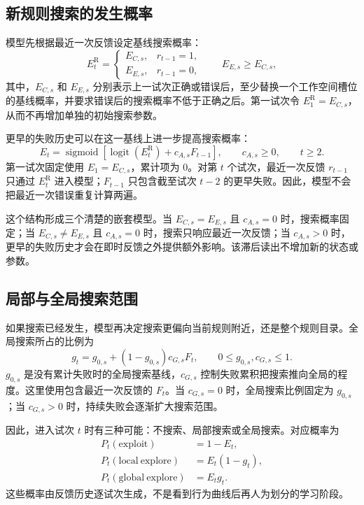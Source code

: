 \documentclass[12pt]{article}
\newcommand{\logit}{\operatorname{logit}}
\newcommand{\sigmoid}{\operatorname{sigmoid}}
\begin{document}
\subsection{新规则搜索的发生概率}

模型先根据最近一次反馈设定基线搜索概率：
\begin{equation}
E_t^{\mathrm R}
=
\begin{cases}
E_{C,s}, & r_{t-1}=1,\\
E_{E,s}, & r_{t-1}=0,
\end{cases}
\qquad
E_{E,s}\geq E_{C,s},
\label{eq:reactive-event}
\end{equation}
其中，$E_{C,s}$ 和 $E_{E,s}$ 分别表示上一试次正确或错误后，至少替换一个工作空间槽位的基线概率，并要求错误后的搜索概率不低于正确之后。第一试次令 $E_1^{\mathrm R}=E_{C,s}$，从而不再增加单独的初始搜索参数。

更早的失败历史可以在这一基线上进一步提高搜索概率：
\begin{equation}
E_t
=\sigmoid\!\left[
\logit(E_t^{\mathrm R})+c_{A,s}F_{t-1}
\right],
\qquad
c_{A,s}\geq0,
\qquad t\geq2.
\label{eq:accumulated-event}
\end{equation}
第一试次固定使用 $E_1=E_{C,s}$，累计项为 0。对第 $t$ 个试次，最近一次反馈 $r_{t-1}$ 只通过 $E_t^{\mathrm R}$ 进入模型；$F_{t-1}$ 只包含截至试次 $t-2$ 的更早失败。因此，模型不会把最近一次错误重复计算两遍。

这个结构形成三个清楚的嵌套模型。当 $E_{C,s}=E_{E,s}$ 且 $c_{A,s}=0$ 时，搜索概率固定；当 $E_{C,s}\neq E_{E,s}$ 且 $c_{A,s}=0$ 时，搜索只响应最近一次反馈；当 $c_{A,s}>0$ 时，更早的失败历史才会在即时反馈之外提供额外影响。该滞后读出不增加新的状态或参数。

\subsection{局部与全局搜索范围}

如果搜索已经发生，模型再决定搜索更偏向当前规则附近，还是整个规则目录。全局搜索所占的比例为
\begin{equation}
g_t
=g_{0,s}+(1-g_{0,s})c_{G,s}F_t,
\qquad
0\leq g_{0,s},c_{G,s}\leq1.
\label{eq:global-search}
\end{equation}
$g_{0,s}$ 是没有累计失败时的全局搜索基线，$c_{G,s}$ 控制失败累积把搜索推向全局的程度。这里使用包含最近一次反馈的 $F_t$。当 $c_{G,s}=0$ 时，全局搜索比例固定为 $g_{0,s}$；当 $c_{G,s}>0$ 时，持续失败会逐渐扩大搜索范围。

因此，进入试次 $t$ 时有三种可能：不搜索、局部搜索或全局搜索。对应概率为
\begin{align}
P_t(\mathrm{exploit})&=1-E_t,
\nonumber\\
P_t(\mathrm{local\ explore})&=E_t(1-g_t),
\nonumber\\
P_t(\mathrm{global\ explore})&=E_tg_t.
\label{eq:strategy-probabilities}
\end{align}
这些概率由反馈历史逐试次生成，不是看到行为曲线后再人为划分的学习阶段。
\end{document}
